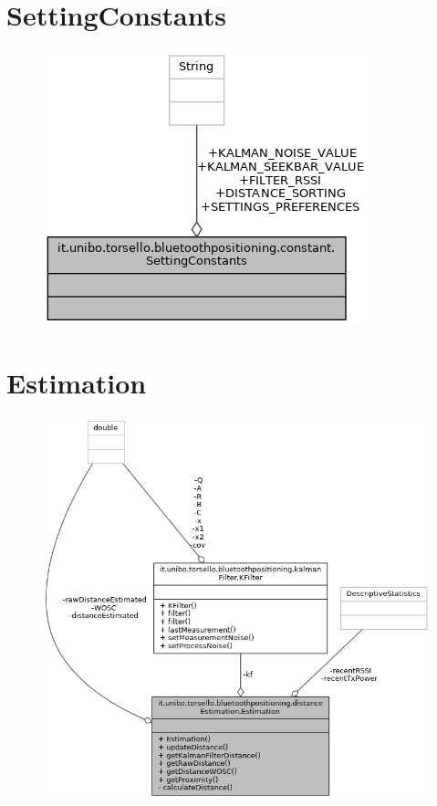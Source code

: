 \section{SettingConstants}
\begin{figure}[ph]
	\centering
	\includegraphics[width=0.5\linewidth]{img/uml/class/classit_1_1unibo_1_1torsello_1_1bluetoothpositioning_1_1constant_1_1SettingConstants__coll__graph.png}
	\caption{}
\end{figure}

\section{Estimation}
\begin{figure}[ph]
	\centering
	\includegraphics[width=1.2\linewidth]{img/uml/class/classit_1_1unibo_1_1torsello_1_1bluetoothpositioning_1_1distanceEstimation_1_1Estimation__coll__graph.png}
	\caption{}
\end{figure}

